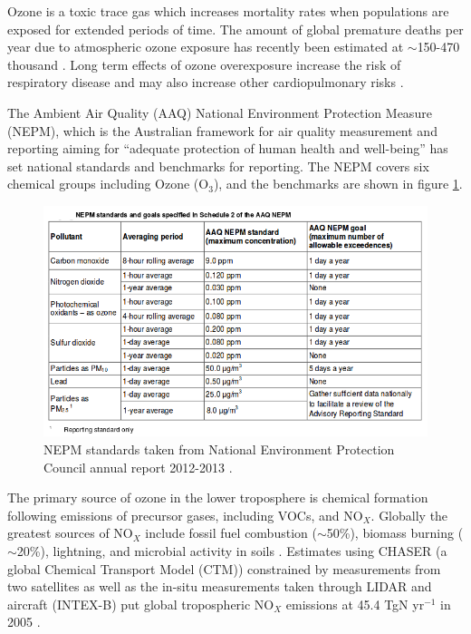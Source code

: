     Ozone is a toxic trace gas which increases mortality rates when populations are exposed for extended periods of time.
    The amount of global premature deaths per year due to atmospheric ozone exposure has recently been estimated at $\sim$150-470 thousand \citep{Silva_2013, Lelieveld_2015}.
    Long term effects of ozone overexposure increase the risk of respiratory disease and may also increase other cardiopulmonary risks \citep{Jerrett_2009}.

    The Ambient Air Quality (AAQ) National Environment Protection Measure (NEPM), which is the Australian framework for air quality measurement and reporting aiming for ``adequate protection of human health and well-being'' has set national standards and benchmarks for reporting. The NEPM covers six chemical groups including Ozone (O$_3$), and the benchmarks are shown in figure \ref{ch1:fig:nepm}.

    \begin{figure}[!htbp]
      \includegraphics[width=\textwidth]{Figures/NEPMStandards.png}
      \caption{ NEPM standards taken from National Environment Protection Council annual report 2012-2013 \citep{nepc_annuals}. }
      \label{ch1:fig:nepm}
    \end{figure}
    
    The primary source of ozone in the lower troposphere is chemical formation following emissions of precursor gases, including VOCs, and NO$_X$.
    Globally the greatest sources of NO$_X$ include fossil fuel combustion ($\sim$50\%), biomass burning ($\sim$20\%), lightning, and microbial activity in soils \citep{Delmas_1997}.
    Estimates using CHASER (a global Chemical Transport Model (CTM)) constrained by measurements from two satellites as well as the in-situ measurements taken through LIDAR and aircraft (INTEX-B) put global tropospheric NO$_X$ emissions at 45.4 TgN yr$^{-1}$ in 2005 \citep{Miyazaki2011}.

